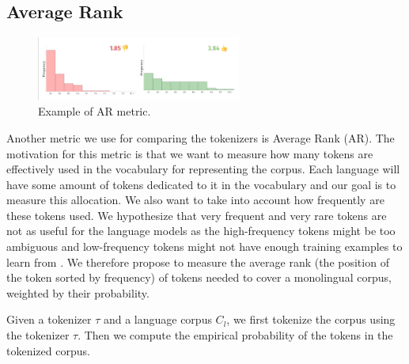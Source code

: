 \subsection{Average Rank}

\begin{figure}[h]
    \centering
    \includegraphics[width=0.6\textwidth]{img/temp/ar_example.png}
    \caption{Example of AR metric.}
    \label{fig:ar_example}
\end{figure}

Another metric we use for comparing the tokenizers is Average Rank (AR). The motivation for this metric is that we want to measure how many tokens are effectively used in the vocabulary for representing the corpus. Each language will have some amount of tokens dedicated to it in the vocabulary and our goal is to measure this allocation. We also want to take into account how frequently are these tokens used. We hypothesize that very frequent and very rare tokens are not as useful for the language models as the high-frequency tokens might be too ambiguous and low-frequency tokens might not have enough training examples to learn from \cite{gowda_finding_2020}. We therefore propose to measure the average rank (the position of the token sorted by frequency) of tokens needed to cover a monolingual corpus, weighted by their probability.

Given a tokenizer $\tau$ and a language corpus $C_l$, we first tokenize the corpus using the tokenizer $\tau$. Then we compute the empirical probability of the tokens in the tokenized corpus.

